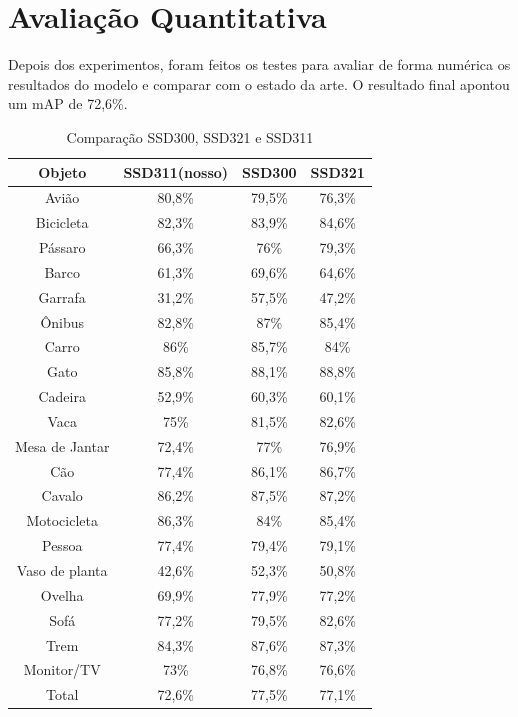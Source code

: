 \section{Avaliação Quantitativa}
\label{secao:5:1:3}

Depois dos experimentos, foram feitos os testes para avaliar de forma numérica os resultados do modelo e comparar com o estado da arte. O resultado final apontou um \ac{mAP} de 72,6\%. 

  \begin{table}[t]
    \centering
    \footnotesize
    \setlength{\abovecaptionskip}{0pt}
    \setlength{\belowcaptionskip}{0pt}
    \caption[Resultados SSD]{Comparação SSD300, SSD321 e SSD311}
    \label{tab:resultados}
    \begin{tabular}{c|c|c|c}
	Objeto &	SSD311(nosso) & SSD300 & SSD321 \\ 
	\hline 
 	Avião 			& 80,8\%	& 79,5\% 	& 76,3\% \\ 
	Bicicleta 		& 82,3\%	& 83,9\% 	& 84,6\%  \\ 
	Pássaro 		& 66,3\%	& 76\%  	& 79,3\%  \\
	Barco 			& 61,3\%	& 69,6\% 	& 64,6\%  \\ 
	Garrafa 		& 31,2\%	& 57,5\%  	& 47,2\%  \\ 
	Ônibus 			& 82,8\%	& 87\%	 	& 85,4\%  \\
	Carro 			& 86\%		& 85,7\%  	& 84\%  \\ 
	Gato 			& 85,8\%	& 88,1\%  	& 88,8\%  \\
	Cadeira 		& 52,9\%	& 60,3\%  	& 60,1\%  \\ 
	Vaca 			& 75\% 		& 81,5\% 	& 82,6\%  \\
	Mesa de Jantar 	& 72,4\% 	& 77\%  	& 76,9\%  \\ 
	Cão 			& 77,4\% 	& 86,1\% 	& 86,7\%  \\
	Cavalo 			& 86,2\% 	& 87,5\% 	& 87,2\%  \\ 
	Motocicleta 	& 86,3\% 	& 84\%  	& 85,4\%  \\
	Pessoa 			& 77,4\% 	& 79,4\%  	& 79,1\%  \\ 
	Vaso de planta 	& 42,6\% 	& 52,3\%  	& 50,8\%  \\
	Ovelha 			& 69,9\%	& 77,9\%  	& 77,2\%  \\
	Sofá 			& 77,2\% 	& 79,5\%  	& 82,6\%  \\
	Trem 			& 84,3\% 	& 87,6\%  	& 87,3\%  \\
	Monitor/TV 		& 73\% 		& 76,8\%  	& 76,6\%  \\ 
	Total 			& 72,6\% 	& 77,5\%  	& 77,1\%  \\
    \end{tabular}
    \\
  \end{table}

